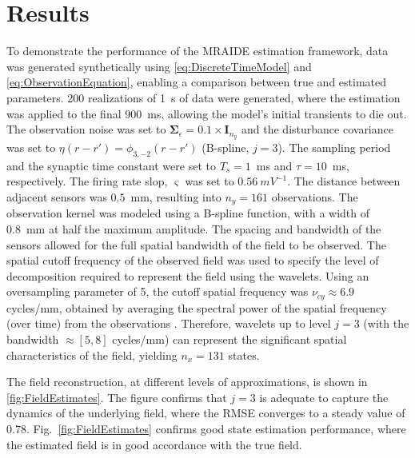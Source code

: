 \documentclass[journal]{IEEEtran}
\newcommand{\dean}[1]{\textcolor{green}{#1}}
\newcommand{\ken}[1]{\textsf{\emph{\textbf{\textcolor{magenta}{#1}}}}}
\newcommand{\cut}[1]{\textcolor{cyan}{#1}}
\begin{document}
\section{Results}
To demonstrate the performance of the MRAIDE estimation framework, data was generated synthetically  using \eqref{eq:DiscreteTimeModel} and \eqref{eq:ObservationEquation}, enabling a comparison between true and estimated parameters. 200 realizations of 1~s of data were generated, where the estimation was applied to the final 900~ms, allowing the model's initial transients to die out. The observation noise was set to $\boldsymbol\Sigma_{\epsilon}=0.1 \times \mathbf{I}_{n_y}$ and the disturbance covariance was set to $\eta(r-r') = \phi_{3,-2}(r-r')$ (B-spline, $j=3$). The sampling period and the synaptic time constant were set to $T_s = 1$~ms and $\tau = 10$~ms, respectively. The firing rate slop, $\varsigma$ was set to $0.56~mV^{-1}$. The distance between adjacent sensors was $0.5$~mm, resulting into $n_y = 161$ observations. The observation kernel was modeled using a B-spline function, with a width of 0.8~mm at half the maximum amplitude. The spacing and bandwidth of the sensors allowed for the full spatial bandwidth of the field to be observed.  %
The spatial cutoff frequency of the observed field was used to specify the level of decomposition required to represent the field using the wavelets. Using an oversampling parameter of 5, the cutoff spatial frequency was $\nu_{cy} \approx 6.9 $ cycles/mm, obtained by averaging the spectral power of the spatial frequency (over time) from the observations \cite{Scerri2009}. Therefore, wavelets up to level $j=3$ (with the bandwidth $\approx[5,8]$ cycles/mm) can represent the significant spatial characteristics of the field, yielding $n_x = 131$ states. 


The field reconstruction, at different levels of approximations, is shown in \figurename{\ref{fig:FieldEstimates}}. The figure confirms that $j=3$ is adequate to capture the dynamics of the underlying field, where the RMSE converges to a steady value of 0.78. Fig.~\ref{fig:FieldEstimates} confirms good state estimation performance, where the estimated field is in good accordance with the true field. 
\end{document}
